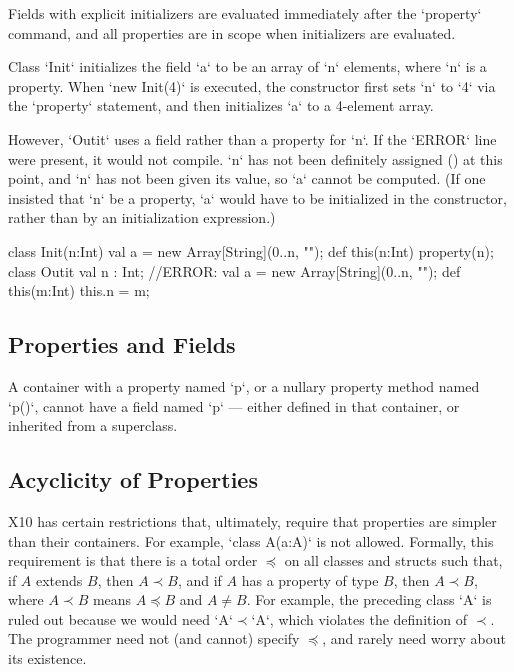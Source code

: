 Fields with explicit initializers are evaluated immediately after the
\xcd`property` command, and all properties are in scope when initializers are
evaluated.  

\begin{ex}
Class \xcd`Init` initializes the field \xcd`a` to be an array of \xcd`n`
elements, where \xcd`n` is a property.    
When \xcd`new Init(4)` is executed, the constructor first sets \xcd`n` to
\xcd`4` via the \xcd`property` statement, and then initializes \xcd`a` to a
4-element array.

However, \xcd`Outit` uses a field rather than a property for \xcd`n`.  
If the \xcd`ERROR` line were present, it would not compile.  \xcd`n` has not
been definitely assigned () at this point, and
\xcd`n` has not been given its value, so \xcd`a` cannot be computed.  
(If one insisted that \xcd`n` be a property, \xcd`a` would have to be
initialized in the constructor, rather than by an initialization expression.)
\begin{xten}
class Init(n:Int) {
  val a = new Array[String](0..n, "");
  def this(n:Int) { property(n); }
}
class Outit {
  val n : Int;
  //ERROR: val a = new Array[String](0..n, "");
  def this(m:Int) { this.n = m; }
}
\end{xten}
%


\end{ex}

\subsection{Properties and Fields}

A container with a property named \xcd`p`, or a nullary property method named
\xcd`p()`, cannot have a field named \xcd`p` --- either defined in that
container, or inherited from a superclass.

\subsection{Acyclicity of Properties}

X10 has certain restrictions that, ultimately, require that properties are
simpler than their containers.  For example, \xcd`class A(a:A){}` is not
allowed.  
Formally, this requirement is that there is  a total order $\preceq$ 
on all classes and
structs such that, if $A$ extends $B$, then $A \prec B$, and
if $A$ has a property of type $B$, then $A \prec B$, where $A \prec B$ means
$A \preceq B$ and $A \ne B$.   
For example, the preceding class \xcd`A` is ruled out because we would need
\xcd`A`$\prec$\xcd`A`, which violates the definition of $\prec$.
The programmer need not (and cannot) specify
$\preceq$, and rarely need worry about its existence.  

